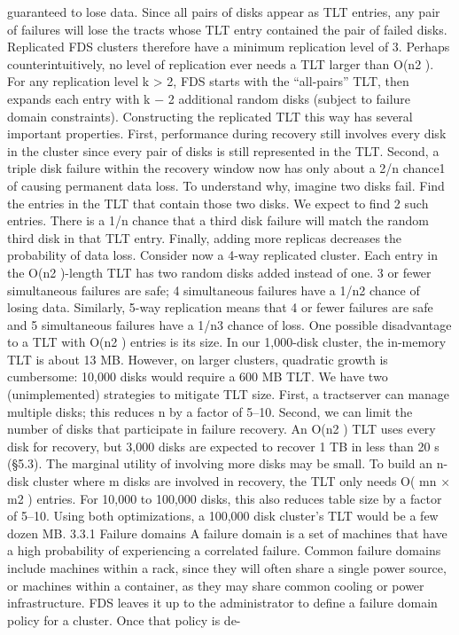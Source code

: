 guaranteed to lose data. Since all pairs of disks appear as
TLT entries, any pair of failures will lose the tracts whose
TLT entry contained the pair of failed disks. Replicated
FDS clusters therefore have a minimum replication level
of 3. Perhaps counterintuitively, no level of replication
ever needs a TLT larger than O(n2 ). For any replication level k > 2, FDS starts with the “all-pairs” TLT, then
expands each entry with k − 2 additional random disks
(subject to failure domain constraints).
Constructing the replicated TLT this way has several
important properties. First, performance during recovery
still involves every disk in the cluster since every pair of
disks is still represented in the TLT.
Second, a triple disk failure within the recovery window now has only about a 2/n chance1 of causing permanent data loss. To understand why, imagine two disks
fail. Find the entries in the TLT that contain those two
disks. We expect to find 2 such entries. There is a 1/n
chance that a third disk failure will match the random
third disk in that TLT entry.
Finally, adding more replicas decreases the probability of data loss. Consider now a 4-way replicated cluster. Each entry in the O(n2 )-length TLT has two random
disks added instead of one. 3 or fewer simultaneous failures are safe; 4 simultaneous failures have a 1/n2 chance
of losing data. Similarly, 5-way replication means that
4 or fewer failures are safe and 5 simultaneous failures
have a 1/n3 chance of loss.
One possible disadvantage to a TLT with O(n2 ) entries
is its size. In our 1,000-disk cluster, the in-memory TLT
is about 13 MB. However, on larger clusters, quadratic
growth is cumbersome: 10,000 disks would require a
600 MB TLT.
We have two (unimplemented) strategies to mitigate
TLT size. First, a tractserver can manage multiple disks;
this reduces n by a factor of 5–10. Second, we can
limit the number of disks that participate in failure recovery. An O(n2 ) TLT uses every disk for recovery,
but 3,000 disks are expected to recover 1 TB in less than
20 s (§5.3). The marginal utility of involving more disks
may be small. To build an n-disk cluster where m disks
are involved in recovery, the TLT only needs O( mn × m2 )
entries. For 10,000 to 100,000 disks, this also reduces
table size by a factor of 5–10. Using both optimizations,
a 100,000 disk cluster’s TLT would be a few dozen MB.
3.3.1 Failure domains
A failure domain is a set of machines that have a high
probability of experiencing a correlated failure. Common failure domains include machines within a rack,
since they will often share a single power source, or machines within a container, as they may share common
cooling or power infrastructure.
FDS leaves it up to the administrator to define a failure domain policy for a cluster. Once that policy is de-


